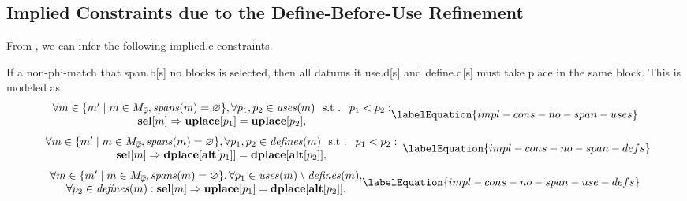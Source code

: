\subsection{Implied Constraints due to the Define-Before-Use Refinement}

From , we can infer the
following \gls{implied.c} \glspl{constraint}.

If a non-\gls{phi-match} that \gls{span.b}[s] no \glspl{block} is selected, then
all \glspl{datum} it \gls{use.d}[s] and \gls{define.d}[s] must take place in the
same \gls{block}.
%
This is modeled as
%
\begin{equation}
  \begin{array}{@{}c@{}}
    \forall m \in
      \mSetBuilder{m'}%
                  {%
                    m \in \mPhiMatchCompSet \hspace{-1pt},
                    \mSpans(m) = \mEmptySet
                  },
    \forall p_1, p_2 \in \mUses(m) \text{ \st } p_1 < p_2 : \\
    \mVar{sel}[m] \mImp \mVar{uplace}[p_1] = \mVar{uplace}[p_2],
  \end{array}
  \labelEquation{impl-cons-no-span-uses}
\end{equation}
%
\begin{equation}
  \begin{array}{c}
    \forall m \in
      \mSetBuilder{m'}%
                  {%
                    m \in \mPhiMatchCompSet \hspace{-1pt},
                    \mSpans(m) = \mEmptySet
                  },
    \forall p_1, p_2 \in \mDefines(m) \text{ \st } p_1 < p_2 : \\
    \mVar{sel}[m]
    \mImp
    \mVar{dplace}[\mVar{alt}[p_1]] = \mVar{dplace}[\mVar{alt}[p_2]],
  \end{array}
  \labelEquation{impl-cons-no-span-defs}
\end{equation}
%
\begin{equation}
  \begin{array}{@{}c@{}}
    \forall m \in
      \mSetBuilder{m'}%
                  {%
                    m \in \mPhiMatchCompSet \hspace{-1pt},
                    \mSpans(m) = \mEmptySet
                  },
    \forall p_1 \in \mUses(m) \setminus \mDefines(m), \\
    \forall p_2 \in \mDefines(m) :
    \mVar{sel}[m]
    \mImp
    \mVar{uplace}[p_1] = \mVar{dplace}[\mVar{alt}[p_2]].
  \end{array}
  \labelEquation{impl-cons-no-span-use-defs}
\end{equation}

